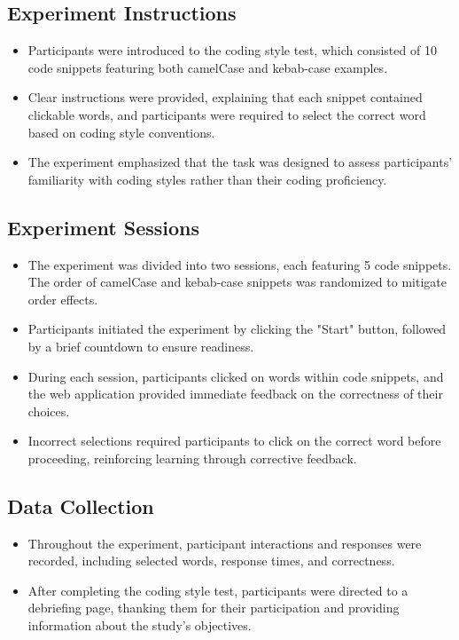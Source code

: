 \documentclass{article}
\begin{document}
\subsection*{Experiment Instructions}

\begin{itemize}
  \item Participants were introduced to the coding style test, which consisted of 10 code snippets featuring both camelCase and kebab-case examples.
  \item Clear instructions were provided, explaining that each snippet contained clickable words, and participants were required to select the correct word based on coding style conventions.
  \item The experiment emphasized that the task was designed to assess participants' familiarity with coding styles rather than their coding proficiency.
\end{itemize}

\subsection*{Experiment Sessions}

\begin{itemize}
  \item The experiment was divided into two sessions, each featuring 5 code snippets. The order of camelCase and kebab-case snippets was randomized to mitigate order effects.
  \item Participants initiated the experiment by clicking the "Start" button, followed by a brief countdown to ensure readiness.
  \item During each session, participants clicked on words within code snippets, and the web application provided immediate feedback on the correctness of their choices.
  \item Incorrect selections required participants to click on the correct word before proceeding, reinforcing learning through corrective feedback.
\end{itemize}

\subsection*{Data Collection}

\begin{itemize}
  \item Throughout the experiment, participant interactions and responses were recorded, including selected words, response times, and correctness.
  \item After completing the coding style test, participants were directed to a debriefing page, thanking them for their participation and providing information about the study's objectives.
\end{itemize}
\end{document}
